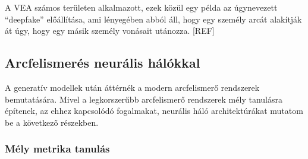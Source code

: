 A VEA számos területen alkalmazott, ezek közül egy példa az úgynevezett ``deepfake'' előállítása, ami lényegében abból áll, hogy egy személy arcát alakítják át úgy, hogy egy másik személy vonásait utánozza. [REF]





\subsection{Arcfelismerés neurális hálókkal}

A generatív modellek után áttérnék a modern arcfelismerő rendszerek bemutatására. Mivel a legkorszerűbb arcfelismerő rendszerek mély tanulásra építenek, az ehhez kapcsolódó fogalmakat, neurális háló architektúrákat mutatom be a következő részekben.

\subsubsection{Mély metrika tanulás}
\label{sec:dml}

